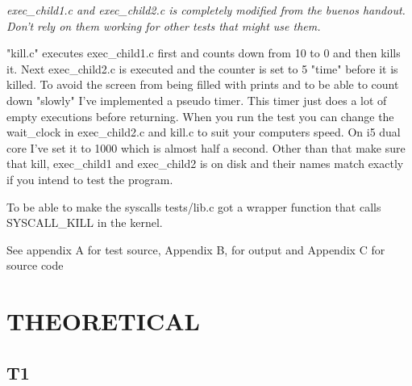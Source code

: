 \documentclass[12pt]{article}
\begin{document}
\textit{
exec\_child1.c and exec\_child2.c is completely modified from the buenos handout. Don't rely on them working for other tests that might use them.
}

"kill.c" executes exec\_child1.c first and counts down from 10 to 0 and then kills it. Next exec\_child2.c is executed and the counter is set to 5 "time" before it is killed. To avoid the screen from being filled with prints and to be able to count down "slowly" I've implemented a pseudo timer. This timer just does a lot of empty executions before returning. When you run the test you can change the wait\_clock in exec\_child2.c and kill.c to suit your computers speed. On i5 dual core I've set it to 1000 which is almost half a second. Other than that make sure that kill, exec\_child1 and exec\_child2 is on disk and their names match exactly if you intend to test the program. 

To be able to make the syscalls tests/lib.c got a wrapper function that calls SYSCALL\_KILL in the kernel.

See appendix A for test source, Appendix B, for output and Appendix C for source code


\newpage
\newpage

\section{THEORETICAL}

\subsection{T1}
\end{document}
